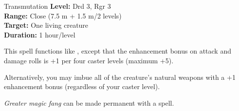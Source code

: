 {Transmutation}
{
	\textbf{Level:}
	Drd 3, Rgr 3\\
	\textbf{Range:}
	Close (7.5 m + 1.5 m/2 levels)\\
	\textbf{Target:}
	One living creature\\
	\textbf{Duration:}
	1 hour/level\\
}
{
	This spell functions like , except that the enhancement bonus on attack and damage rolls is +1 per four caster levels (maximum +5).

	Alternatively, you may imbue all of the creature's natural weapons with a +1 enhancement bonus (regardless of your caster level).

	\emph{Greater magic fang} can be made permanent with a  spell.

}
